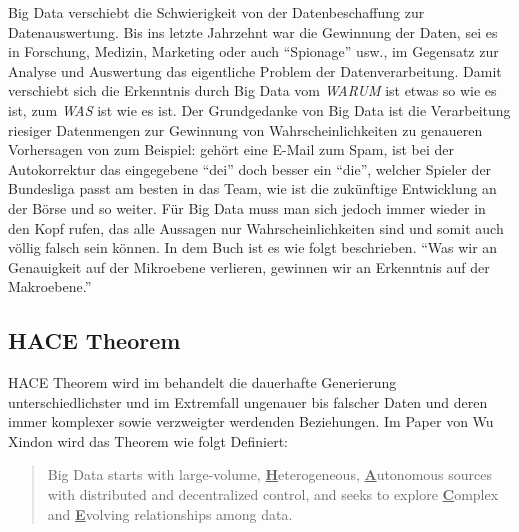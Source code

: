 \documentclass[12pt,journal,compsoc]{IEEEtran}
\begin{document}
Big Data verschiebt die Schwierigkeit von der Datenbeschaffung zur Datenauswertung. 
Bis ins letzte Jahrzehnt war die Gewinnung der Daten, sei es in Forschung, Medizin, Marketing oder 
auch \enquote{Spionage} usw., im Gegensatz zur Analyse und Auswertung das eigentliche Problem der Datenverarbeitung.
Damit verschiebt sich die Erkenntnis durch Big Data vom \emph{WARUM} ist etwas so wie es ist, zum \emph{WAS} ist wie es ist.
Der Grundgedanke von Big Data ist die Verarbeitung riesiger Datenmengen zur Gewinnung von Wahrscheinlichkeiten zu genaueren Vorhersagen von zum Beispiel:
gehört eine E-Mail zum Spam, ist bei der Autokorrektur das eingegebene \enquote{dei} doch besser ein \enquote{die}, welcher Spieler der Bundesliga 
passt am besten in das Team, wie ist die zukünftige Entwicklung an der Börse und so weiter. Für Big Data muss man sich jedoch immer
wieder in den Kopf rufen, das alle Aussagen nur Wahrscheinlichkeiten sind und somit auch völlig falsch sein können. In dem Buch \cite{mayer2014big} ist es wie folgt beschrieben.
\enquote{Was wir an Genauigkeit auf der Mikroebene verlieren, gewinnen wir an Erkenntnis auf der Makroebene.}
\subsection{HACE Theorem}
 HACE Theorem wird im behandelt die dauerhafte Generierung unterschiedlichster und im Extremfall ungenauer bis falscher Daten 
und deren immer komplexer sowie verzweigter werdenden Beziehungen. Im Paper von Wu Xindon \cite{wu2014data} wird das Theorem wie folgt Definiert:
\begin{quote}
Big Data starts with large-volume, \underline{\textbf{H}}eterogeneous, 
\underline{\textbf{A}}utonomous sources with distributed and decentralized control, 
and seeks to explore \underline{\textbf{C}}omplex and \underline{\textbf{E}}volving relationships 
among data.
\end{quote}
\end{document}
